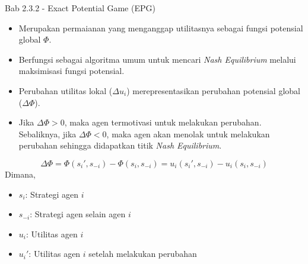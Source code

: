 \begin{frame}{Bab 2.3.2 - Exact Potential Game (EPG)}
    \begin{itemize}
        \item Merupakan permaianan yang menganggap utilitasnya sebagai fungsi potensial global $\Phi$.
        \item Berfungsi sebagai algoritma umum untuk mencari \textit{Nash Equilibrium} melalui maksimisasi fungsi potensial.
        \item Perubahan utilitas lokal ($\Delta u_i$) merepresentasikan perubahan potensial global ($\Delta \Phi$).
        \item Jika $\Delta \Phi > 0$, maka agen termotivasi untuk melakukan perubahan. Sebaliknya, jika $\Delta \Phi < 0$, maka agen akan menolak untuk melakukan perubahan sehingga didapatkan titik \textit{Nash Equilibrium}.
    \end{itemize}
    \begin{equation}
        \Delta \Phi = \Phi(s_i', s_{-i}) - \Phi(s_i, s_{-i}) = u_i(s_i', s_{-i}) - u_i(s_i, s_{-i})
    \end{equation}
    Dimana,
    \begin{itemize}
        \item $s_i$: Strategi agen $i$
        \item $s_{-i}$: Strategi agen selain agen $i$
        \item $u_i$: Utilitas agen $i$
        \item $u_i'$: Utilitas agen $i$ setelah melakukan perubahan
    \end{itemize}
\end{frame}

